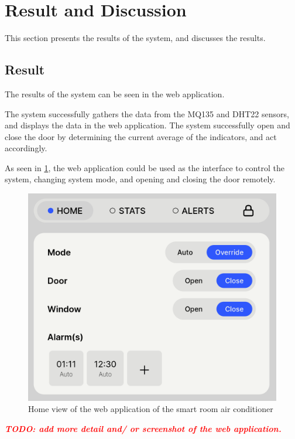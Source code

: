 \section{Result and Discussion}
This section presents the results of the system,
and discusses the results.

\subsection{Result}
The results of the system can be seen in the web
application.

The system successfully gathers the data from the
MQ135 and DHT22 sensors, and displays the data in
the web application.
The system successfully open and close the door by
determining the current average of the indicators,
and act accordingly.

As seen in \ref{webapp-home-view}, the web application
could be used as the interface to control the system,
changing system mode, and opening and closing the door
remotely.

\begin{figure}
      \centerline{\includegraphics[scale=0.2]{resources/webapp-home-view.png}}
      \caption{Home view of the web application of the smart room air conditioner}
      \label{webapp-home-view}
\end{figure}

\textcolor{red}{
      \textbf{
            \emph{TODO: add more detail and/
                  or screenshot of the web application.}
      }
}

